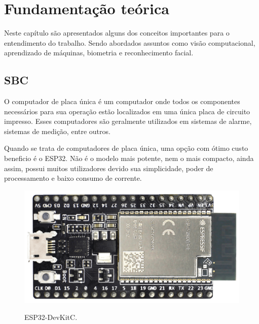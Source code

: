 \chapter{Fundamentação te\'orica}\label{cap:referencialTeorico}

Neste capítulo são apresentados alguns dos conceitos importantes para o entendimento
do trabalho. Sendo abordados assuntos como visão computacional, aprendizado de máquinas,
biometria e reconhecimento facial.

\section{SBC}\label{sec:formatacaoTexto}

O computador de placa única é um computador onde todos os componentes
necessários para sua operação estão localizados em uma única placa de circuito impresso. Esses
computadores são geralmente utilizados em sistemas de alarme, sistemas de medição, entre
outros.

Quando se trata de computadores de placa única, uma opção com ótimo custo beneficio 
é o ESP32. Não é o modelo mais potente, nem o mais compacto, ainda assim, possui muitos 
utilizadores devido sua simplicidade, poder de processamento e baixo consumo de corrente.

\begin{figure}[h!]
    \centering
    \caption{ESP32-DevKitC.}
    \includegraphics[scale=0.13]{figuras/esp323.png} 
    \label{espzin}
    \centering
\end{figure}

